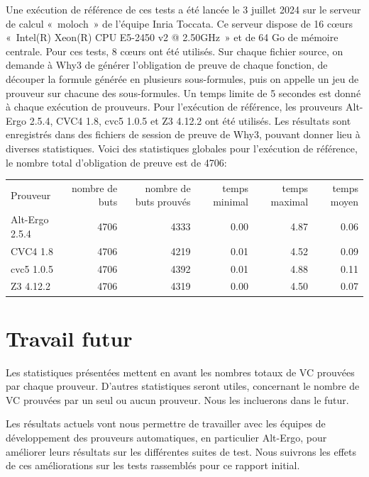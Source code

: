 \documentclass[a4paper,11pt]{article}
\begin{document}
Une exécution de référence de ces tests a été lancée le 3 juillet 2024
sur le serveur de calcul «~moloch~» de l'équipe Inria Toccata. Ce
serveur dispose de 16 c{\oe}urs «~Intel(R) Xeon(R) CPU E5-2450 v2 @
2.50GHz~» et de 64 Go de mémoire centrale. Pour ces tests, 8 c{\oe}urs
ont été utilisés. Sur chaque fichier source, on demande à Why3 de
générer l'obligation de preuve de chaque fonction, de découper la
formule générée en plusieurs sous-formules, puis on appelle un jeu de
prouveur sur chacune des sous-formules. Un temps limite de 5 secondes est donné à chaque exécution de prouveurs. Pour l'exécution de référence,
les prouveurs Alt-Ergo 2.5.4, CVC4 1.8, cvc5 1.0.5 et Z3 4.12.2 ont
été utilisés. Les résultats sont enregistrés dans des fichiers de
session de preuve de Why3, pouvant donner lieu à diverses
statistiques. Voici des statistiques globales pour l'exécution de
référence, le nombre total d'obligation de preuve est de 4706:
\begin{center}
  \begin{tabular}{|l|r|r|r|r|r|}
    \hline
  \rowcolor{gray!50} Prouveur
  & \multicolumn{1}{p{0.13\textwidth}|}{nombre de buts}
  & \multicolumn{1}{p{0.13\textwidth}|}{nombre de buts prouvés}
  & \multicolumn{1}{p{0.13\textwidth}|}{temps minimal}
  & \multicolumn{1}{p{0.13\textwidth}|}{temps maximal}
  & \multicolumn{1}{p{0.13\textwidth}|}{temps moyen}
  \\
  Alt-Ergo 2.5.4                &  4706  & 4333   & 0.00  & 4.87  & 0.06 \\
  CVC4 1.8                      &  4706  & 4219   & 0.01  & 4.52  & 0.09 \\
  cvc5 1.0.5                    &  4706  & 4392   & 0.01  & 4.88  & 0.11 \\
  Z3 4.12.2                     &  4706  & 4319   & 0.00  & 4.50  & 0.07 \\
  \hline
\end{tabular}
\end{center}

\section{Travail futur}

Les statistiques présentées mettent en avant les nombres totaux de VC prouvées
par chaque prouveur. D'autres statistiques seront utiles, concernant le nombre
de VC prouvées par un seul ou aucun prouveur. Nous les incluerons dans le futur.

Les résultats actuels vont nous permettre de travailler avec les équipes de
développement des prouveurs automatiques, en particulier Alt-Ergo, pour
améliorer leurs résultats sur les différentes suites de test. Nous suivrons les
effets de ces améliorations sur les tests rassemblés pour ce rapport initial.
\end{document}
